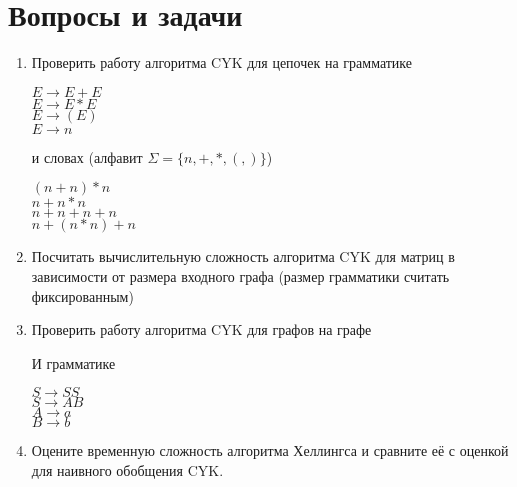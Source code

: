 \section{Вопросы и задачи}
\begin{enumerate}
    \item Проверить работу алгоритма CYK для цепочек на грамматике
    \begin{flushleft}
    $E \to E + E$ \\
    $E \to E * E$ \\
    $E \to (E)$   \\
    $E \to n$     \\
    \end{flushleft}
    и словах (алфавит $\Sigma = \{n, +, *, (, )\}$)
    \begin{flushleft}
    $ (n + n) * n$    \\
    $ n + n * n$      \\
    $n + n + n + n$   \\
    $n + (n * n) + n$ \\
    \end{flushleft}

    \item Посчитать вычислительную сложность алгоритма CYK для матриц в зависимости от размера входного графа (размер грамматики считать фиксированным)

    \item Проверить работу алгоритма CYK для графов на графе

    \begin{center}
    \end{center}

    И грамматике

    \begin{flushleft}
        $S \to S S$ \\
        $S \to A B$ \\
        $A \to a$   \\
        $B \to b$     \\
    \end{flushleft}

    \item Оцените временную сложность алгоритма Хеллингса и сравните её с оценкой для наивного обобщения CYK.

\end{enumerate}